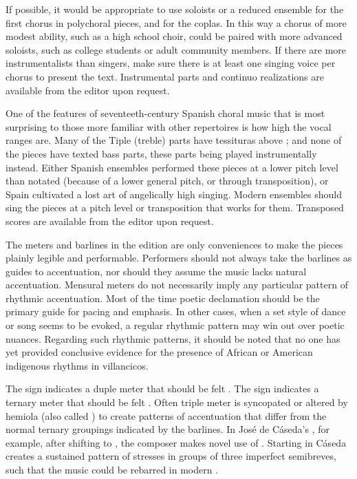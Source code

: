If possible, it would be appropriate to use soloists or a reduced ensemble for
the first chorus in polychoral pieces, and for the coplas.
In this way a chorus of more modest ability, such as a high school choir, could
be paired with more advanced soloists, such as college students or adult
community members.
If there are more instrumentalists than singers, make sure there is at least one
singing voice per chorus to present the text.
Instrumental parts and continuo realizations are available from the editor upon
request.

One of the features of seventeeth-century Spanish choral music that is most
surprising to those more familiar with other repertoires is how high the vocal
ranges are.
Many of the Tiple (treble) parts have tessituras above ; and none of
the pieces have texted bass parts, these parts being played instrumentally
instead.
Either Spanish ensembles performed these pieces at a lower pitch level than
notated (because of a lower general pitch, or through transposition), or Spain
cultivated a lost art of angelically high singing.
Modern ensembles should sing the pieces at a pitch level or transposition that
works for them.
Transposed scores are available from the editor upon request.

The meters and barlines in the edition are only conveniences to make the pieces
plainly legible and performable.
Performers should not always take the barlines as guides to accentuation, nor
should they assume the music lacks natural accentuation.
Mensural meters do not necessarily imply any particular pattern of rhythmic 
accentuation.
Most of the time poetic declamation should be the primary guide for pacing
and emphasis.
In other cases, when a set style of dance or song seems to be evoked, a regular
rhythmic pattern may win out over poetic nuances.
Regarding such rhythmic patterns, it should be noted that no one has yet
provided conclusive evidence for the presence of African or American indigenous
rhythms in villancicos.

The sign \meterC{} indicates a duple meter that should be felt .
The sign \meterCThree{} indicates a ternary meter that should be felt
.
Often triple meter is syncopated or altered by hemiola (also called
) to create patterns of accentuation that differ from the
normal ternary groupings indicated by the barlines.
In José de Cáseda's , for example, after shifting
to \meterCThree{}, the composer makes novel use of .
Starting in  Cáseda creates a sustained pattern of stresses in
groups of three imperfect semibreves, such that the music could be rebarred in
modern .

